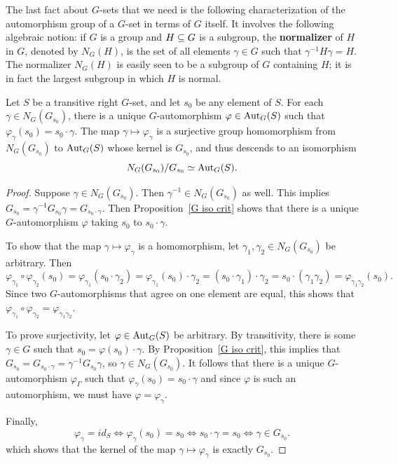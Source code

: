 The last fact about $G$-sets that we need is the following characterization of the
automorphism group of a $G$-set in terms of $G$ itself. It involves the following algebraic notion: if $G$ is a group and $H\subseteq G$ is a subgroup, the \textbf{normalizer} of $H$ in $G$, denoted by $N_G(H)$, is the set of all elements $\gamma\in G$ such that $\gamma^{-1}H\gamma=H$. The normalizer $N_G(H)$ is easily seen to be a subgroup of $G$ containing $H$; it is in fact the largest subgroup in which $H$ is normal.
\begin{proposition}\label{char G auto}
Let $S$ be a transitive right $G$-set, and let $s_0$ be any element of $S$. For each $\gamma\in N_G(G_{s_0})$, there is a unique $G$-automorphism $\varphi\in\mathrm{Aut}_G(S)$ such that $\varphi_\gamma(s_0)=s_0\cdot\gamma$. The map $\gamma\mapsto\varphi_\gamma$ is a surjective group homomorphism from $N_G(G_{s_0})$ to $\mathrm{Aut}_G(S)$ whose kernel is $G_{s_0}$, and thus descends to an isomorphism
\[N_G(G_{s_0})/G_{s_0}\simeq\mathrm{Aut}_G(S).\]
\end{proposition}
\begin{proof}
Suppose $\gamma\in N_G(G_{s_0})$. Then $\gamma^{-1}\in N_G(G_{s_0})$ as well. This implies $G_{s_0}=\gamma^{-1}G_{s_0}\gamma=G_{s_0\cdot\gamma}$. Then Proposition~\ref{G iso crit} shows that there is a unique $G$-automorphism $\varphi$ taking $s_0$ to $s_0\cdot\gamma$.\par 
To show that the map $\gamma\mapsto\varphi_\gamma$ is a homomorphism, let $\gamma_1,\gamma_2\in N_G(G_{s_0})$ be arbitrary. Then
\[\varphi_{\gamma_1}\circ\varphi_{\gamma_2}(s_0)=\varphi_{\gamma_1}(s_0\cdot\gamma_2)=\varphi_{\gamma_1}(s_0)\cdot\gamma_2=(s_0\cdot\gamma_1)\cdot\gamma_2=s_0\cdot(\gamma_1\gamma_2)=\varphi_{\gamma_1\gamma_2}(s_0).\]
Since two $G$-automorphisms that agree on one element are equal, this shows that $\varphi_{\gamma_1}\circ\varphi_{\gamma_2}=\varphi_{\gamma_1\gamma_2}$.\par
To prove surjectivity, let $\varphi\in\mathrm{Aut}_G(S)$ be arbitrary. By transitivity, there is some $\gamma\in G$ such that $s_0=\varphi(s_0)\cdot\gamma$. By Proposition~\ref{G iso crit}, this implies that $G_{s_0}=G_{s_0\cdot\gamma}=\gamma^{-1}G_{s_0}\gamma$, so $\gamma\in N_G(G_{s_0})$. It follows that there is a unique $G$-automorphism $\varphi_\Gamma$ such that $\varphi_\gamma(s_0)=s_0\cdot\gamma$ and since $\varphi$ is such an automorphism, we must have $\varphi=\varphi_\gamma$.\par
Finally,
\[\varphi_\gamma=id_S\iff\varphi_\gamma(s_0)=s_0\iff s_0\cdot\gamma=s_0\iff\gamma\in G_{s_0}.\]
which shows that the kernel of the map $\gamma\mapsto\varphi_\gamma$ is exactly $G_{s_0}$.
\end{proof}
